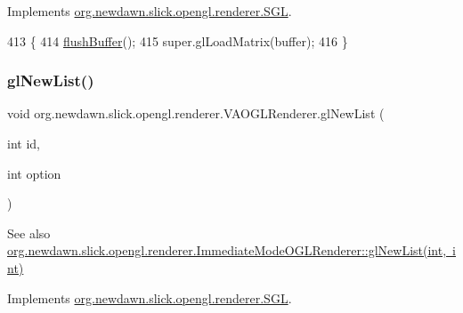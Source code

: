 Implements \mbox{\hyperlink{interfaceorg_1_1newdawn_1_1slick_1_1opengl_1_1renderer_1_1_s_g_l_a41baff345ccbf53de61ebb3c77e02914}{org.\+newdawn.\+slick.\+opengl.\+renderer.\+S\+GL}}.


\begin{DoxyCode}
413                                                  \{
414         \mbox{\hyperlink{classorg_1_1newdawn_1_1slick_1_1opengl_1_1renderer_1_1_v_a_o_g_l_renderer_ab3e5846e23cb9b7d4018e1ce45e2fea9}{flushBuffer}}();
415         super.glLoadMatrix(buffer);
416     \}
\end{DoxyCode}
\mbox{\label{classorg_1_1newdawn_1_1slick_1_1opengl_1_1renderer_1_1_v_a_o_g_l_renderer_af106842219b6ad234609527d83f24e6b}} 
\subsubsection{\texorpdfstring{gl\+New\+List()}{glNewList()}}
{\footnotesize\ttfamily void org.\+newdawn.\+slick.\+opengl.\+renderer.\+V\+A\+O\+G\+L\+Renderer.\+gl\+New\+List (\begin{DoxyParamCaption}\item[{int}]{id,  }\item[{int}]{option }\end{DoxyParamCaption})\hspace{0.3cm}{\ttfamily [inline]}}

\begin{DoxySeeAlso}{See also}
\mbox{\hyperlink{classorg_1_1newdawn_1_1slick_1_1opengl_1_1renderer_1_1_immediate_mode_o_g_l_renderer_a39396e48f77dfffca38c83a01cf865d9}{org.\+newdawn.\+slick.\+opengl.\+renderer.\+Immediate\+Mode\+O\+G\+L\+Renderer\+::gl\+New\+List(int, int)}} 
\end{DoxySeeAlso}


Implements \mbox{\hyperlink{interfaceorg_1_1newdawn_1_1slick_1_1opengl_1_1renderer_1_1_s_g_l_a85746cd7e0de9297a821619097a5f7cc}{org.\+newdawn.\+slick.\+opengl.\+renderer.\+S\+GL}}.



